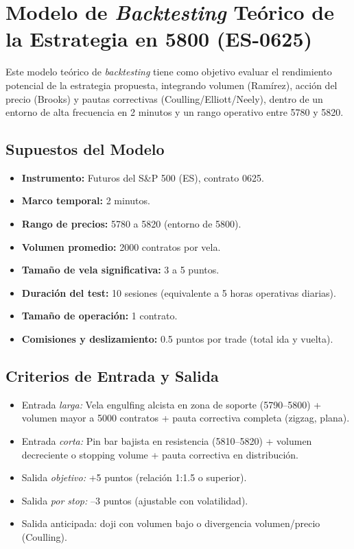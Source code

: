 \section{Modelo de \textit{Backtesting} Te\'{o}rico de la Estrategia en 5800 (ES-0625)}

Este modelo te\'{o}rico de \textit{backtesting} tiene como objetivo evaluar el rendimiento potencial de la estrategia propuesta, integrando volumen (Ram\'irez), acci\'on del precio (Brooks) y pautas correctivas (Coulling/Elliott/Neely), dentro de un entorno de alta frecuencia en 2 minutos y un rango operativo entre 5780 y 5820.

\subsection{Supuestos del Modelo}

\begin{itemize}
    \item \textbf{Instrumento:} Futuros del S\&P 500 (ES), contrato 0625.
    \item \textbf{Marco temporal:} 2 minutos.
    \item \textbf{Rango de precios:} 5780 a 5820 (entorno de 5800).
    \item \textbf{Volumen promedio:} 2000 contratos por vela.
    \item \textbf{Tama\~no de vela significativa:} 3 a 5 puntos.
    \item \textbf{Duraci\'on del test:} 10 sesiones (equivalente a 5 horas operativas diarias).
    \item \textbf{Tama\~no de operaci\'on:} 1 contrato.
    \item \textbf{Comisiones y deslizamiento:} 0.5 puntos por trade (total ida y vuelta).
\end{itemize}

\subsection{Criterios de Entrada y Salida}

\begin{itemize}
    \item Entrada \textit{larga:} Vela engulfing alcista en zona de soporte (5790–5800) + volumen mayor a 5000 contratos + pauta correctiva completa (zigzag, plana).
    \item Entrada \textit{corta:} Pin bar bajista en resistencia (5810–5820) + volumen decreciente o stopping volume + pauta correctiva en distribución.
    \item Salida \textit{objetivo:} +5 puntos (relaci\'on 1:1.5 o superior).
    \item Salida \textit{por stop:} –3 puntos (ajustable con volatilidad).
    \item Salida anticipada: doji con volumen bajo o divergencia volumen/precio (Coulling).
\end{itemize}

